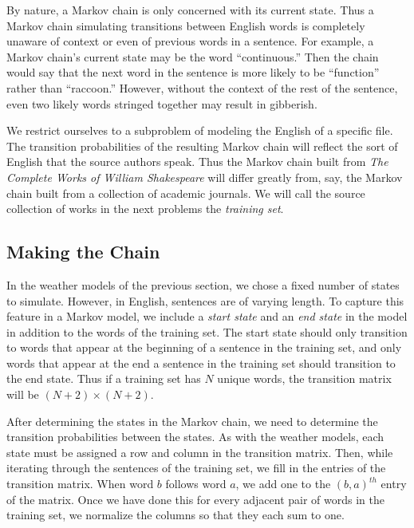 By nature, a Markov chain is only concerned with its current state.
Thus a Markov chain simulating transitions between English words is completely unaware of context or even of previous words in a sentence.
For example, a Markov chain's current state may be the word ``continuous.''
Then the chain would say that the next word in the sentence is more likely to be ``function'' rather than ``raccoon.''
However, without the context of the rest of the sentence, even two likely words stringed together may result in gibberish.

We restrict ourselves to a subproblem of modeling the English of a specific file.
The transition probabilities of the resulting Markov chain will reflect the sort of English that the source authors speak.
Thus the Markov chain built from \emph{The Complete Works of William Shakespeare} will differ greatly from, say, the Markov chain built from a collection of academic journals.
We will call the source collection of works in the next problems the \emph{training set}.

\subsection*{Making the Chain} %

In the weather models of the previous section, we chose a fixed number of states to simulate.
However, in English, sentences are of varying length.
To capture this feature in a Markov model, we include a \emph{start state} and an \emph{end state} in the model in addition to the words of the training set.
The start state should only transition to words that appear at the beginning of a sentence in the training set, and only words that appear at the end a sentence in the training set should transition to the end state.
Thus if a training set has $N$ unique words, the transition matrix will be $(N+2) \times (N+2)$.

After determining the states in the Markov chain, we need to determine the transition probabilities between the states.
As with the weather models, each state must be assigned a row and column in the transition matrix.
Then, while iterating through the sentences of the training set, we fill in the entries of the transition matrix.
When word $b$ follows word $a$, we add one to the $(b,a)^{th}$ entry of the matrix.
Once we have done this for every adjacent pair of words in the training set, we normalize the columns so that they each sum to one.


